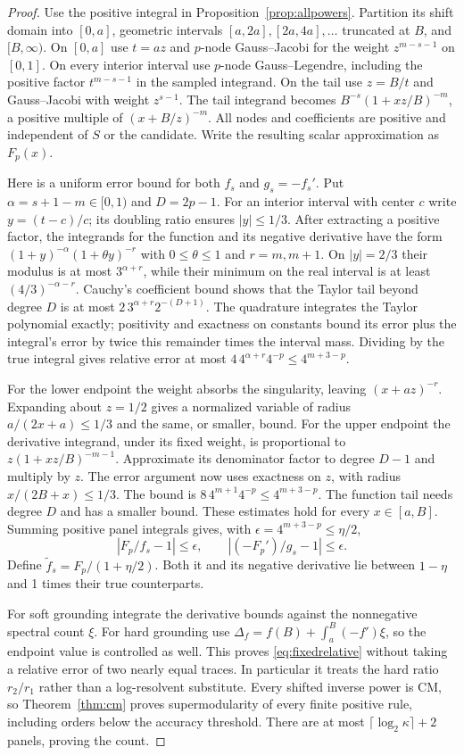\documentclass[11pt]{article}
\begin{document}
\begin{proof}
Use the positive integral in Proposition~\ref{prop:allpowers}.
Partition its shift domain into $[0,a]$, geometric intervals
$[a,2a],[2a,4a],\ldots$ truncated at $B$, and $[B,\infty)$.
On $[0,a]$ use $t=az$ and $p$-node Gauss--Jacobi for the weight
$z^{m-s-1}$ on $[0,1]$. On every interior interval use $p$-node
Gauss--Legendre, including the positive factor $t^{m-s-1}$ in
the sampled integrand. On the tail use $z=B/t$ and Gauss--Jacobi
with weight $z^{s-1}$. The tail integrand becomes
$B^{-s}(1+xz/B)^{-m}$, a positive multiple of
$(x+B/z)^{-m}$. All nodes and coefficients are positive and
independent of $S$ or the candidate. Write the resulting scalar
approximation as $F_p(x)$.

Here is a uniform error bound for both $f_s$ and $g_s=-f_s'$.
Put $\alpha=s+1-m\in[0,1)$ and $D=2p-1$.
For an interior interval with center $c$ write $y=(t-c)/c$;
its doubling ratio ensures $|y|\leq1/3$. After extracting a
positive factor, the integrands for the function and its negative
derivative have the form
$(1+y)^{-\alpha}(1+\theta y)^{-r}$ with $0\leq\theta\leq1$
and $r=m,m+1$. On $|y|=2/3$ their modulus is at most
$3^{\alpha+r}$, while their minimum on the real interval is at
least $(4/3)^{-\alpha-r}$.
Cauchy's coefficient bound shows that the Taylor tail beyond degree
$D$ is at most $2\,3^{\alpha+r}2^{-(D+1)}$.
The quadrature integrates the Taylor polynomial exactly; positivity
and exactness on constants bound its error plus the integral's error
by twice this remainder times the interval mass. Dividing by the
true integral gives relative error at most
$4\,4^{\alpha+r}4^{-p}\leq4^{m+3-p}$.

For the lower endpoint the weight absorbs the singularity, leaving
$(x+az)^{-r}$. Expanding about $z=1/2$ gives a normalized variable
of radius $a/(2x+a)\leq1/3$ and the same, or smaller, bound.
For the upper endpoint the derivative integrand, under its fixed
weight, is proportional to $z(1+xz/B)^{-m-1}$.
Approximate its denominator factor to degree $D-1$ and multiply
by $z$. The error argument now uses exactness on $z$, with radius
$x/(2B+x)\leq1/3$. The bound is
$8\,4^{m+1}4^{-p}\leq4^{m+3-p}$.
The function tail needs degree $D$ and has a smaller bound.
These estimates hold for every $x\in[a,B]$. Summing positive panel
integrals gives, with $\epsilon=4^{m+3-p}\leq\eta/2$,
\[
 |F_p/f_s-1|\leq\epsilon,\qquad
 |(-F_p')/g_s-1|\leq\epsilon.
\]
Define $\widetilde f_s=F_p/(1+\eta/2)$. Both it and its negative
derivative lie between $1-\eta$ and 1 times their true counterparts.

For soft grounding integrate the derivative bounds against the
nonnegative spectral count $\xi$. For hard grounding use
$\Delta_f=f(B)+\int_a^B(-f')\xi$, so the endpoint value is controlled
as well. This proves \eqref{eq:fixedrelative} without taking a
relative error of two nearly equal traces. In particular it treats
the hard ratio $r_2/r_1$ rather than a log-resolvent substitute.
Every shifted inverse power is CM, so Theorem~\ref{thm:cm} proves
supermodularity of every finite positive rule, including orders
below the accuracy threshold. There are at most
$\lceil\log_2\kappa\rceil+2$ panels, proving the count.
\end{proof}
\end{document}

